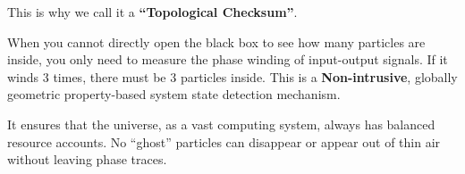 This is why we call it a \textbf{``Topological Checksum''}.

When you cannot directly open the black box to see how many particles are inside, you only need to measure the phase winding of input-output signals. If it winds 3 times, there must be 3 particles inside. This is a \textbf{Non-intrusive}, globally geometric property-based system state detection mechanism.

It ensures that the universe, as a vast computing system, always has balanced resource accounts. No ``ghost'' particles can disappear or appear out of thin air without leaving phase traces.

